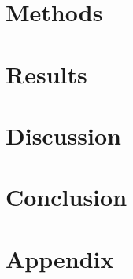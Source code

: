 \documentclass[12pt,twoside]{report}
\begin{document}
\chapter{Methods}


\chapter{Results}


\chapter{Discussion}


\chapter{Conclusion}


\appendix 
\chapter{Appendix}


\printbibliography
\end{document}
